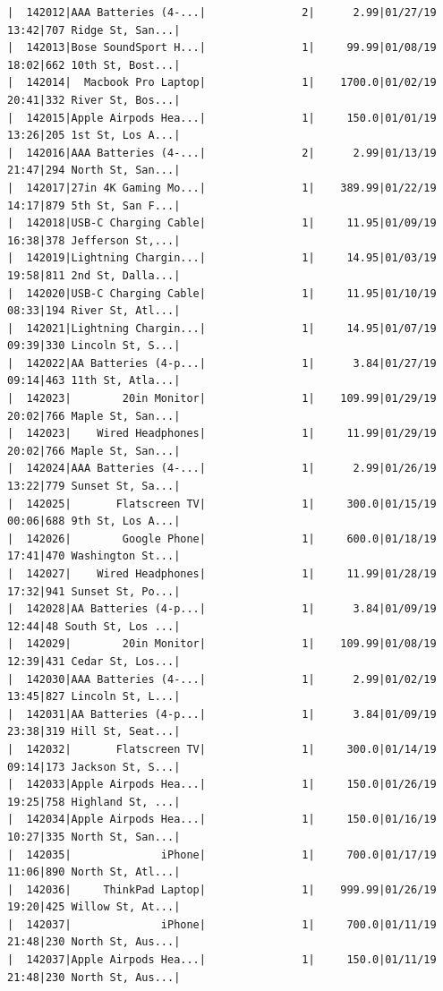 \documentclass[
  letterpaper,
  DIV=11,
  numbers=noendperiod]{scrartcl}
\begin{document}
\begin{verbatim}
|  142012|AAA Batteries (4-...|               2|      2.99|01/27/19 13:42|707 Ridge St, San...|
|  142013|Bose SoundSport H...|               1|     99.99|01/08/19 18:02|662 10th St, Bost...|
|  142014|  Macbook Pro Laptop|               1|    1700.0|01/02/19 20:41|332 River St, Bos...|
|  142015|Apple Airpods Hea...|               1|     150.0|01/01/19 13:26|205 1st St, Los A...|
|  142016|AAA Batteries (4-...|               2|      2.99|01/13/19 21:47|294 North St, San...|
|  142017|27in 4K Gaming Mo...|               1|    389.99|01/22/19 14:17|879 5th St, San F...|
|  142018|USB-C Charging Cable|               1|     11.95|01/09/19 16:38|378 Jefferson St,...|
|  142019|Lightning Chargin...|               1|     14.95|01/03/19 19:58|811 2nd St, Dalla...|
|  142020|USB-C Charging Cable|               1|     11.95|01/10/19 08:33|194 River St, Atl...|
|  142021|Lightning Chargin...|               1|     14.95|01/07/19 09:39|330 Lincoln St, S...|
|  142022|AA Batteries (4-p...|               1|      3.84|01/27/19 09:14|463 11th St, Atla...|
|  142023|        20in Monitor|               1|    109.99|01/29/19 20:02|766 Maple St, San...|
|  142023|    Wired Headphones|               1|     11.99|01/29/19 20:02|766 Maple St, San...|
|  142024|AAA Batteries (4-...|               1|      2.99|01/26/19 13:22|779 Sunset St, Sa...|
|  142025|       Flatscreen TV|               1|     300.0|01/15/19 00:06|688 9th St, Los A...|
|  142026|        Google Phone|               1|     600.0|01/18/19 17:41|470 Washington St...|
|  142027|    Wired Headphones|               1|     11.99|01/28/19 17:32|941 Sunset St, Po...|
|  142028|AA Batteries (4-p...|               1|      3.84|01/09/19 12:44|48 South St, Los ...|
|  142029|        20in Monitor|               1|    109.99|01/08/19 12:39|431 Cedar St, Los...|
|  142030|AAA Batteries (4-...|               1|      2.99|01/02/19 13:45|827 Lincoln St, L...|
|  142031|AA Batteries (4-p...|               1|      3.84|01/09/19 23:38|319 Hill St, Seat...|
|  142032|       Flatscreen TV|               1|     300.0|01/14/19 09:14|173 Jackson St, S...|
|  142033|Apple Airpods Hea...|               1|     150.0|01/26/19 19:25|758 Highland St, ...|
|  142034|Apple Airpods Hea...|               1|     150.0|01/16/19 10:27|335 North St, San...|
|  142035|              iPhone|               1|     700.0|01/17/19 11:06|890 North St, Atl...|
|  142036|     ThinkPad Laptop|               1|    999.99|01/26/19 19:20|425 Willow St, At...|
|  142037|              iPhone|               1|     700.0|01/11/19 21:48|230 North St, Aus...|
|  142037|Apple Airpods Hea...|               1|     150.0|01/11/19 21:48|230 North St, Aus...|

\end{verbatim}
\end{document}
